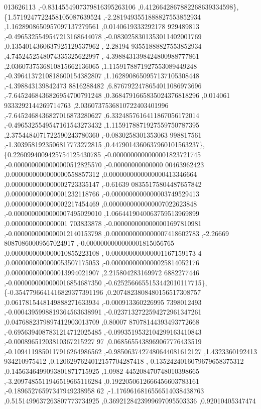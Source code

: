 \begin{DoxyCode}
      013626113 ,-0.8314554907379816395263106 ,0.4126642867882268639334598\},
\{1.5719247722458105087639524 ,-2.2819493551888827553852934 ,1.1628908650957097137279561 ,0.0140619333292178
      929489813 ,-0.4965325549547213168644078 ,-0.0830258301353011402001769 ,0.1354014360637925129537962 ,-2.28194
      93551888827553852934 ,4.7452452548074335325622997 ,-4.3988431398424800988777861 ,2.0360737536810815662136065
       ,1.1159178871927553089449248 ,-0.3964137210818600154382807 ,1.1628908650957137105308448 ,-4.398843139842473
      8816288482 ,6.8767922478654011086973696 ,-7.6452468436826954700791248 ,0.3684791665835024376818296 ,0.014061
      9333292144269714763 ,2.0360737536810722403401996 ,-7.6452468436827016873280627 ,6.3324857616411867056172014 
      ,-0.4965325549547161543273432 ,1.1159178871927559750787395 ,2.3754484071722590243780360 ,-0.0830258301353063
      998817561 ,-1.3039581923506817773272815 ,0.4479014360637960101563237\},
\{0.2260994009425754125430785 ,-0.0000000000000001823721745 ,-0.0000000000000000512825570 ,-0.00000000000000
      00463962423 ,0.0000000000000000558857312 ,0.0000000000000000413346664 ,0.0000000000000002723335147 ,-0.61639
      08355175804487657842 ,0.0000000000000001232118766 ,-0.0000000000000003749529413 ,0.0000000000000002217454469
       ,0.0000000000000007022623848 ,-0.0000000000000007495029010 ,1.0664419040063759513969899 ,0.0000000000000001
      703833878 ,-0.0000000000000001697810981 ,-0.0000000000000012140153798 ,0.0000000000000007418602783 ,-2.26669
      80870860009567024917 ,-0.0000000000000001815056765 ,0.0000000000000010855223108 ,-0.000000000000001167159173
      4 ,0.0000000000000053507175053 ,-0.0000000000000025814052176 ,0.0000000000000013994021907 ,2.215804283169972
      6882277446 ,-0.0000000000000016854687350 ,-0.6252566655153442010117715\},
\{-0.3547796641416829377391196 ,0.2074823808480156517308757 ,0.0617815448149888271633934 ,-0.000913360226995
      7398012493 ,-0.0004395998819364563638991 ,-0.0237132722594272961347261 ,0.0476882379897412903013709 ,0.80007
      87078144393493772668 ,-0.6956394087831214712025485 ,-0.0993519532104299163410843 ,-0.00089651203810367215227
      97 ,0.0685655438969067776433519 ,-0.1094119850117916264986562 ,-0.9850637427480644081612127 ,1.4323360192413
      934210975412 ,0.1206297624012157704287418 ,-0.1352424016079679658375312 ,0.1456346499093801871715925 ,1.0982
      445208470748010398665 ,-3.2097485511946519665116284 ,0.1922050612666456603783161 ,-0.18965276597347949238958
      62 ,-1.1769616816556514038438763 ,0.5151499637263807773734925 ,0.3692128423999697095503336 ,0.92010405347474

\end{DoxyCode}
